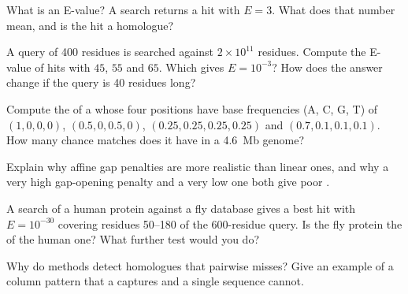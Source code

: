 \begin{exercise}[$\star$]\label{exo:b3:bioinformatics:4}
What is an E-value? A search returns a hit with $E = 3$. What does that
number mean, and is the hit a homologue?
\end{exercise}

\begin{exercise}[$\star\star$]\label{exo:b3:bioinformatics:5}
A query of \num{400} residues is searched against $2\times 10^{11}$
residues. Compute the E-value of hits with  $45$, $55$ and
$65$. Which  gives $E = 10^{-3}$? How does the answer change
if the query is \num{40} residues long?
\end{exercise}

\begin{exercise}[$\star\star$]\label{exo:b3:bioinformatics:6}
Compute the  of a  whose four positions have
base frequencies (A, C, G, T) of $(1,0,0,0)$, $(0.5,0,0.5,0)$,
$(0.25,0.25,0.25,0.25)$ and $(0.7,0.1,0.1,0.1)$. How many chance
matches does it have in a \qty{4.6}{Mb} genome?
\end{exercise}

\begin{exercise}[$\star\star$]\label{exo:b3:bioinformatics:7}
Explain why affine gap penalties are more realistic than linear ones,
and why a very high gap-opening penalty and a very low one both give
poor .
\end{exercise}

\begin{exercise}[$\star\star$]\label{exo:b3:bioinformatics:8}
A  search of a human protein against a fly database gives a best
hit with $E = 10^{-30}$ covering residues 50--180 of the
\num{600}-residue query. Is the fly protein the  of the human
one? What further test would you do?
\end{exercise}

\begin{exercise}[$\star\star$]\label{exo:b3:bioinformatics:9}
Why do  methods detect homologues that pairwise 
misses? Give an example of a column pattern that a  captures
and a single sequence cannot.
\end{exercise}

